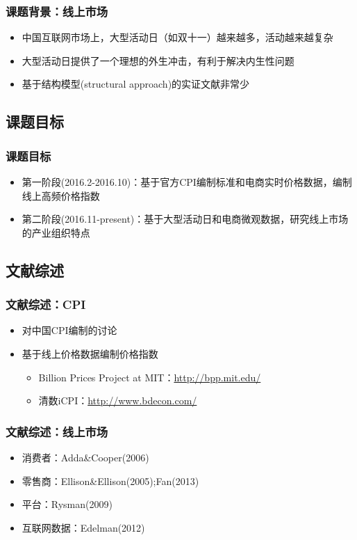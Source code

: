 \documentclass{beamer}
\begin{document}
\begin{frame}
\frametitle{课题背景：线上市场}
\begin{itemize}
  \item 中国互联网市场上，大型活动日（如双十一）越来越多，活动越来越复杂
  \item 大型活动日提供了一个理想的外生冲击，有利于解决内生性问题
  \item 基于结构模型(structural approach)的实证文献非常少
\end{itemize}
\end{frame}

\subsection{课题目标}
\begin{frame}
\frametitle{课题目标}
\begin{itemize}
  \item 第一阶段(2016.2-2016.10)：基于官方CPI编制标准和电商实时价格数据，编制线上高频价格指数
  \item 第二阶段(2016.11-present)：基于大型活动日和电商微观数据，研究线上市场的产业组织特点
\end{itemize}
\end{frame}

\subsection{文献综述}
\begin{frame}
\frametitle{文献综述：CPI}
\begin{itemize}
  \item 对中国CPI编制的讨论
  \item 基于线上价格数据编制价格指数
  \begin{itemize}
    \item Billion Prices Project at MIT：\url{http://bpp.mit.edu/}
    \item 清数iCPI：\url{http://www.bdecon.com/}
  \end{itemize}
\end{itemize}
\end{frame}

\begin{frame}
\frametitle{文献综述：线上市场}
\begin{itemize}
  \item 消费者：Adda\&Cooper(2006)
  \item 零售商：Ellison\&Ellison(2005);Fan(2013)
  \item 平台：Rysman(2009)
  \item 互联网数据：Edelman(2012)
\end{itemize}
\end{frame}
\end{document}
